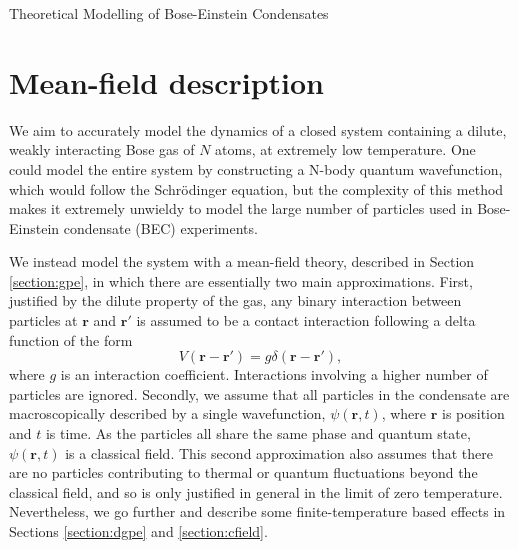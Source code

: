 \begin{chapter}{\label{cha:theoretical_model}Theoretical Modelling of Bose-Einstein Condensates}
\section{\label{section:meanfield} Mean-field description}
We aim to accurately model the dynamics of a closed system containing a dilute, weakly interacting Bose gas of $N$ atoms, at extremely low temperature. One could model the entire system by constructing a N-body quantum wavefunction, which would follow the Schr\"odinger equation, but the complexity of this method makes it extremely unwieldy to model the large number of particles used in Bose-Einstein condensate (BEC) experiments.

We instead model the system with a mean-field theory, described in Section \ref{section:gpe}, in which there are essentially two main approximations. First, justified by the dilute property of the gas, any binary interaction between particles at $\mathbf{r}$ and $\mathbf{r}'$ is assumed to be a contact interaction following a delta function of the form
\begin{equation*}
V(\mathbf{r}-\mathbf{r}') = g \delta(\mathbf{r}-\mathbf{r}'),
\end{equation*}
where $g$ is an interaction coefficient. Interactions involving a higher number of particles are ignored. Secondly, we assume that all particles in the condensate are macroscopically described by a single wavefunction, $\psi(\mathbf{r},t)$, where $\mathbf{r}$ is position and $t$ is time. As the particles all share the same phase and quantum state, $\psi(\mathbf{r},t)$ is a classical field. This second approximation also assumes that there are no particles contributing to thermal or quantum fluctuations beyond the classical field, and so is only justified in general in the limit of zero temperature. Nevertheless, we go further and describe some finite-temperature based effects in Sections \ref{section:dgpe}
and \ref{section:cfield}.


\end{chapter}
